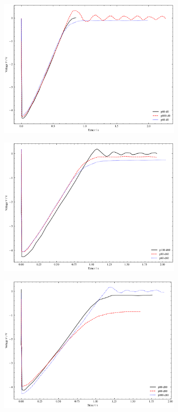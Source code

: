 \begin{figure}
	\centering
	\begin{subfigure}{0.48\columnwidth}
		\centering
		\includegraphics[width=0.8\linewidth]{src/figures/oscilloscope-grouped/d-0.png}
	\end{subfigure}
	\begin{subfigure}{0.48\columnwidth}
		\centering
		\includegraphics[width=0.8\linewidth]{src/figures/oscilloscope-grouped/d-60.png}
	\end{subfigure}
	\begin{subfigure}{0.48\columnwidth}
		\centering
		\includegraphics[width=0.8\linewidth]{src/figures/oscilloscope-grouped/d-80.png}

\end{subfigure}
\end{figure}
